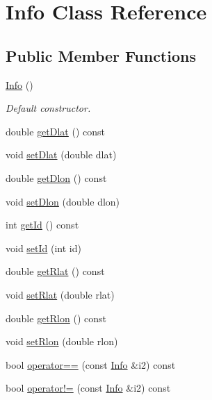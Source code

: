 \hypertarget{class_info}{}\section{Info Class Reference}
\label{class_info}
\subsection*{Public Member Functions}
\begin{DoxyCompactItemize}
\item 
\mbox{\label{class_info_a89823cdd427a9dfdf3d2e43d938222bd}} 
\hyperlink{class_info_a89823cdd427a9dfdf3d2e43d938222bd}{Info} ()
\begin{DoxyCompactList}\small\item\em Default constructor. \end{DoxyCompactList}\item 
double \hyperlink{class_info_ab7a047fbb1967753eb0b55b13be17bd7}{get\+Dlat} () const
\item 
void \hyperlink{class_info_adb15b65c585c268ab6c93a618a38b43c}{set\+Dlat} (double dlat)
\item 
double \hyperlink{class_info_a478165d200d4c8fc8d16c030d6653f0f}{get\+Dlon} () const
\item 
void \hyperlink{class_info_ac0009b3522d2a87e589961c7154dfbca}{set\+Dlon} (double dlon)
\item 
int \hyperlink{class_info_ab534c4bfb1ce63dc2ce89e147130a67a}{get\+Id} () const
\item 
void \hyperlink{class_info_a88de44a5733caaeae720af118567c34c}{set\+Id} (int id)
\item 
double \hyperlink{class_info_ad2b2c037bdb95007e331dc1167cd0d10}{get\+Rlat} () const
\item 
void \hyperlink{class_info_a27d233723f43ea183047fbcb6bbc0d7f}{set\+Rlat} (double rlat)
\item 
double \hyperlink{class_info_a829bd3485845e44a02078341a80238aa}{get\+Rlon} () const
\item 
void \hyperlink{class_info_a41adc61220842b6729762502a006897a}{set\+Rlon} (double rlon)
\item 
bool \hyperlink{class_info_ade9362e816fc6c393fbcefe49a3bd12f}{operator==} (const \hyperlink{class_info}{Info} \&i2) const
\item 
bool \hyperlink{class_info_ac54fc69d9e73807549757ae1a3a8731d}{operator!=} (const \hyperlink{class_info}{Info} \&i2) const
\end{DoxyCompactItemize}


